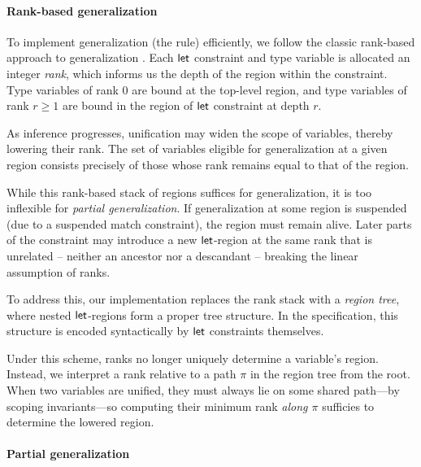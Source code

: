 \documentclass[acmsmall,screen,nonacm,review]{acmart}
\begin{document}
\paragraph{Rank-based generalization}
To implement generalization (the  rule) efficiently, we
follow the classic rank-based approach to generalization \citep{TODO}. Each
$\mathopen{}\mathrel{\mathsf{let}}$ constraint and type variable is allocated an integer \emph{rank}, which
informs us the depth of the region within the constraint. Type variables of
rank $0$ are bound at the top-level region, and type variables of rank $r \geq
1$ are bound in the region of $\mathopen{}\mathrel{\mathsf{let}}$ constraint at depth $r$.

As inference progresses, unification may widen the scope of variables,
thereby lowering their rank. The set of variables eligible for
generalization at a given region consists precisely of those
whose rank remains equal to that of the region.


While this rank-based stack of regions suffices for \ML generalization,
it is too inflexible for \emph{partial generalization}. If generalization
at some region is suspended (\eg due to a suspended match constraint),
the region must remain alive. Later parts of the constraint may
introduce a new $\mathopen{}\mathrel{\mathsf{let}}$-region at the same rank that is unrelated --
neither an ancestor nor a descandant -- breaking the linear assumption
of ranks.

To address this, our implementation replaces the rank stack
with a \emph{region tree}, where nested $\mathopen{}\mathrel{\mathsf{let}}$-regions form
a proper tree structure. In the specification, this structure
is encoded syntactically by $\mathopen{}\mathrel{\mathsf{let}}$ constraints themselves.


Under this scheme, ranks no longer uniquely determine a variable's
region. Instead, we interpret a rank relative to a path $\pi$ in the
region tree from the root. When two variables are unified, they must
always lie on some shared path---by scoping invariants---so computing
their minimum rank \emph{along $\pi$} sufficies to determine the
lowered region.


\paragraph{Partial generalization}
\end{document}
